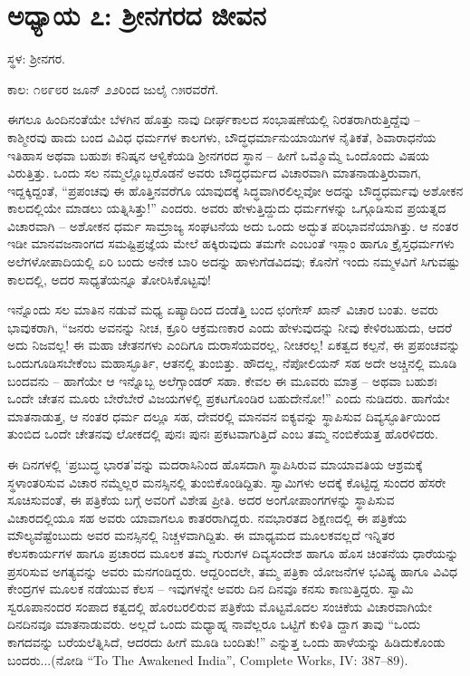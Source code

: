 
\chapter{ಅಧ್ಯಾಯ ೭: ಶ‍್ರೀನಗರದ ಜೀವನ}

ಸ್ಥಳ: ಶ‍್ರೀನಗರ.

ಕಾಲ: ೧೮೯೮ರ ಜೂನ್ ೨೨ರಿಂದ ಜುಲೈ ೧೫ರವರೆಗೆ.

ಈಗಲೂ ಹಿಂದಿನಂತೆಯೇ ಬೆಳಗಿನ ಹೊತ್ತು ನಾವು ದೀರ್ಘಕಾಲದ ಸಂಭಾಷಣೆಯಲ್ಲಿ ನಿರತರಾಗಿರುತ್ತಿದ್ದೆವು – ಕಾಶ್ಮೀರವು ಹಾದು ಬಂದ ವಿವಿಧ ಧರ್ಮಗಳ ಕಾಲಗಳು, ಬೌದ್ಧಧರ್ಮಾನುಯಾಯಿಗಳ ನೈತಿಕತೆ, ಶಿವಾರಾಧನೆಯ ಇತಿಹಾಸ ಅಥವಾ ಬಹುಶಃ ಕನಿಷ್ಕನ ಆಳ್ವಿಕೆಯಡಿ ಶ‍್ರೀನಗರದ ಸ್ಥಾನ – ಹೀಗೆ ಒಮ್ಮೊಮ್ಮೆ ಒಂದೊಂದು ವಿಷಯ ವಿರುತ್ತಿತ್ತು. ಒಂದು ಸಲ ನಮ್ಮಲ್ಲೊಬ್ಬರೊಡನೆ ಅವರು ಬೌದ್ಧಧರ್ಮದ ವಿಚಾರವಾಗಿ ಮಾತನಾಡುತ್ತಿರುವಾಗ, ಇದ್ದಕ್ಕಿದ್ದಂತೆ, “ಪ್ರಪಂಚವು ಈ ಹೊತ್ತಿನವರೆಗೂ ಯಾವುದಕ್ಕೆ ಸಿದ್ಧವಾಗಿರಲಿಲ್ಲವೋ ಅದನ್ನು ಬೌದ್ಧಧರ್ಮವು ಅಶೋಕನ ಕಾಲದಲ್ಲಿಯೇ ಮಾಡಲು ಯತ್ನಿಸಿತ್ತು!” ಎಂದರು. ಅವರು ಹೇಳುತ್ತಿದ್ದುದು ಧರ್ಮಗಳನ್ನು ಒಗ್ಗೂಡಿಸುವ ಪ್ರಯತ್ನದ ವಿಚಾರವಾಗಿ – ಅಶೋಕನ ಧರ್ಮ ಸಾಮ್ರಾಜ್ಯ ಸಂಘಟನೆಯ ಅದು ಒಂದು ಅದ್ಭುತ ಪರಿಭಾವನೆಯಾಗಿತ್ತು. ಆ ನಂತರ ಇಡೀ ಮಾನವಜನಾಂಗದ ಸಮಷ್ಟಿಪ್ರಜ್ಞೆಯ ಮೇಲೆ ಹಕ್ಕಿರುವುದು ತಮಗೇ ಎಂಬಂತೆ ಇಸ್ಲಾಂ ಹಾಗೂ ಕ್ರೈಸ್ತಧರ್ಮಗಳು ಅಲೆಗಳೋಪಾದಿಯಲ್ಲಿ ಏರಿ ಬಂದು ಅನೇಕ ಬಾರಿ ಅದನ್ನು ಹಾಳುಗೆಡವಿದವು; ಕೊನೆಗೆ ಇಂದು ನಮ್ಮಳವಿಗೆ ಸಿಗುವಷ್ಟು ಕಾಲದಲ್ಲಿ, ಅದರ ಸಾಧ್ಯತೆಯನ್ನೂ ತೋರಿಸಿಕೊಟ್ಟವು!

ಇನ್ನೊಂದು ಸಲ ಮಾತಿನ ನಡುವೆ ಮಧ್ಯ ಏಷ್ಯಾದಿಂದ ದಂಡೆತ್ತಿ ಬಂದ ಛಂಗೇಸ್ ಖಾನ್ ವಿಚಾರ ಬಂತು. ಅವರು ಭಾವುಕರಾಗಿ, “ಜನರು ಅವನನ್ನು ನೀಚ, ಕ್ರೂರಿ ಆಕ್ರಮಣಕಾರ ಎಂದು ಹೇಳುವುದನ್ನು ನೀವು ಕೇಳಿರಬಹುದು, ಆದರೆ ಅದು ನಿಜವಲ್ಲ! ಈ ಮಹಾ ಚೇತನಗಳು ಎಂದಿಗೂ ದುರಾಸೆಯವರಲ್ಲ, ನೀಚರಲ್ಲ! ಏಕತ್ವದ ಕಲ್ಪನೆ, ಈ ಪ್ರಪಂಚವನ್ನು ಒಂದುಗೂಡಿಸಬೇಕೆಂಬ ಮಹಾಸ್ಫೂರ್ತಿ, ಆತನಲ್ಲಿ ತುಂಬಿತ್ತು. ಹೌದಲ್ಲ, ನೆಪೋಲಿಯನ್ ಸಹ ಅದೇ ಅಚ್ಚಿನಲ್ಲಿ ಮೂಡಿ ಬಂದವನು – ಹಾಗೆಯೇ ಆ ಇನ್ನೊಬ್ಬ ಅಲೆಗ್ಸಾಂಡರ್ ಸಹಾ. ಕೇವಲ ಈ ಮೂವರು ಮಾತ್ರ – ಅಥವಾ ಬಹುಶಃ ಒಂದೇ ಚೇತನ ಮೂರು ಬೇರೆಬೇರೆ ವಿಜಯಗಳಲ್ಲಿ ಪ್ರಕಟಗೊಂಡಿರ ಬಹುದೇನೋ!” ಎಂದು ನುಡಿದರು. ಹಾಗೆಯೇ ಮಾತನಾಡುತ್ತ, ಆ ನಂತರ ಧರ್ಮ ದಲ್ಲೂ ಸಹ, ದೇವರಲ್ಲಿ ಮಾನವನ ಐಕ್ಯವನ್ನು ಸ್ಥಾಪಿಸುವ ದಿವ್ಯಸ್ಫೂರ್ತಿಯಿಂದ ತುಂಬಿದ ಒಂದೇ ಚೇತನವು ಲೋಕದಲ್ಲಿ ಪುನಃ ಪುನಃ ಪ್ರಕಟವಾಗುತ್ತಿದೆ ಎಂಬ ತಮ್ಮ ನಂಬಿಕೆಯತ್ತ ಹೊರಳಿದರು.

ಈ ದಿನಗಳಲ್ಲಿ ‘ಪ್ರಬುದ್ಧ ಭಾರತ’ವನ್ನು ಮದರಾಸಿನಿಂದ ಹೊಸದಾಗಿ ಸ್ಥಾಪಿಸಿರುವ ಮಾಯಾವತಿಯ ಆಶ್ರಮಕ್ಕೆ ಸ್ಥಳಾಂತರಿಸುವ ವಿಚಾರ ನಮ್ಮೆಲ್ಲರ ಮನಸ್ಸಿನಲ್ಲಿ ತುಂಬಿಕೊಂಡಿದ್ದಿತು. ಸ್ವಾಮಿಗಳು ಅದಕ್ಕೆ ಕೊಟ್ಟಿದ್ದ ಸುಂದರ ಹೆಸರೇ ಸೂಚಿಸುವಂತೆ, ಈ ಪತ್ರಿಕೆಯ ಬಗ್ಗೆ ಅವರಿಗೆ ವಿಶೇಷ ಪ್ರೀತಿ. ಅದರ ಅಂಗೋಪಾಂಗಗಳನ್ನು ಸ್ಥಾಪಿಸುವ ವಿಚಾರದಲ್ಲಿಯೂ ಸಹ ಅವರು ಯಾವಾಗಲೂ ಕಾತರರಾಗಿದ್ದರು. ನವಭಾರತದ ಶಿಕ್ಷಣದಲ್ಲಿ ಈ ಪತ್ರಿಕೆಯ ಮೌಲ್ಯವೆಷ್ಟೆಂಬುದು ಅವರ ಮನಸ್ಸಿನಲ್ಲಿ ನಿಚ್ಚಳವಾಗಿದ್ದಿತು. ಈ ಮಾಧ್ಯಮದ ಮೂಲಕವಲ್ಲದೆ ಇನ್ನಿತರ ಕೆಲಸಕಾರ್ಯಗಳ ಹಾಗೂ ಪ್ರಚಾರದ ಮೂಲಕ ತಮ್ಮ ಗುರುಗಳ ದಿವ್ಯಸಂದೇಶ ಹಾಗೂ ಹೊಸ ಚಿಂತನೆಯ ಧಾರೆಯನ್ನು ಪ್ರಸರಿಸುವ ಅಗತ್ಯವನ್ನು ಅವರು ಮನಗಂಡಿದ್ದರು. ಆದ್ದರಿಂದಲೇ, ತಮ್ಮ ಪತ್ರಿಕಾ ಯೋಜನೆಗಳ ಭವಿಷ್ಯ ಹಾಗೂ ವಿವಿಧ ಕೇಂದ್ರಗಳ ಮೂಲಕ ನಡೆಯುವ ಕೆಲಸ – ಇವುಗಳನ್ನೇ ಅವರು ದಿನ ದಿನವೂ ಕನಸು ಕಾಣುತ್ತಿದ್ದರು. ಸ್ವಾಮಿ ಸ್ವರೂಪಾನಂದರ ಸಂಪಾದ ಕತ್ವದಲ್ಲಿ ಹೊರಬರಲಿರುವ ಪತ್ರಿಕೆಯ ಮೊಟ್ಟಮೊದಲ ಸಂಚಿಕೆಯ ವಿಚಾರವಾಗಿಯೇ ದಿನದಿನವೂ ಮಾತನಾಡುವರು. ಅಲ್ಲದೆ ಒಂದು ಮಧ್ಯಾಹ್ನ ನಾವೆಲ್ಲರೂ ಒಟ್ಟಿಗೆ ಕುಳಿತಿ ದ್ದಾಗ ತಾವು “ಒಂದು ಕಾಗದವನ್ನು ಬರೆಯಲೆತ್ನಿಸಿದೆ, ಆದರದು ಹೀಗೆ ಮೂಡಿ ಬಂದಿತು!” ಎನ್ನುತ್ತ ಒಂದು ಹಾಳೆಯನ್ನು ಹಿಡಿದುಕೊಂಡು ಬಂದರು...(ನೋಡಿ “To The Awakened India”, Complete Works, IV: 387–89).

